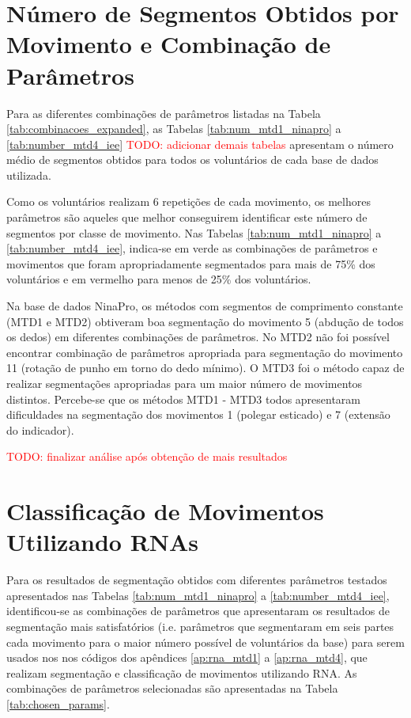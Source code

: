 		\section{Número de Segmentos Obtidos por Movimento e Combinação de Parâmetros}
Para as diferentes combinações de parâmetros listadas na Tabela \ref{tab:combinacoes_expanded}, as Tabelas \ref{tab:num_mtd1_ninapro} a \ref{tab:number_mtd4_iee} \textcolor{red}{TODO: adicionar demais tabelas} apresentam o número médio de segmentos obtidos para todos os voluntários de cada base de dados utilizada.

Como os voluntários realizam 6 repetições de cada movimento, os melhores parâmetros são aqueles que melhor conseguirem identificar este número de segmentos por classe de movimento. Nas Tabelas \ref{tab:num_mtd1_ninapro} a \ref{tab:number_mtd4_iee}, indica-se em verde as combinações de parâmetros e movimentos que foram apropriadamente segmentados para mais de 75\% dos voluntários e em vermelho para menos de 25\% dos voluntários.




Na base de dados NinaPro, os métodos com segmentos de comprimento constante (MTD1 e MTD2) obtiveram boa segmentação do movimento 5 (abdução de todos os dedos) em diferentes combinações de parâmetros. No MTD2 não foi possível encontrar combinação de parâmetros apropriada para segmentação do movimento 11 (rotação de punho em torno do dedo mínimo). O MTD3 foi o método capaz de realizar segmentações apropriadas para um maior número de movimentos distintos. Percebe-se que os métodos MTD1 - MTD3 todos apresentaram dificuldades na segmentação dos movimentos 1 (polegar esticado) e 7 (extensão do indicador).

\textcolor{red}{TODO: finalizar análise após obtenção de mais resultados}

		\section{Classificação de Movimentos Utilizando RNAs}
Para os resultados de segmentação obtidos com diferentes parâmetros testados apresentados nas Tabelas \ref{tab:num_mtd1_ninapro} a \ref{tab:number_mtd4_iee}, identificou-se as combinações de parâmetros que apresentaram os resultados de segmentação mais satisfatórios (i.e. parâmetros que segmentaram em seis partes cada movimento para o maior número possível de voluntários da base) para serem usados nos nos códigos dos apêndices \ref{ap:rna_mtd1} a \ref{ap:rna_mtd4}, que realizam segmentação e classificação de movimentos utilizando RNA. As combinações de parâmetros selecionadas são apresentadas na Tabela \ref{tab:chosen_params}.

